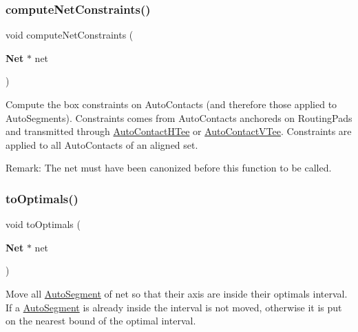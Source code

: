 \subsubsection{\texorpdfstring{compute\+Net\+Constraints()}{computeNetConstraints()}}
{\footnotesize\ttfamily void compute\+Net\+Constraints (\begin{DoxyParamCaption}\item[{\textbf{ Net} $\ast$}]{net }\end{DoxyParamCaption})}

Compute the box constraints on Auto\+Contacts (and therefore those applied to Auto\+Segments). Constraints comes from Auto\+Contacts anchoreds on Routing\+Pads and transmitted through \hyperlink{classKatabatic_1_1AutoContactHTee}{Auto\+Contact\+H\+Tee} or \hyperlink{classKatabatic_1_1AutoContactVTee}{Auto\+Contact\+V\+Tee}. Constraints are applied to all Auto\+Contacts of an aligned set.

\begin{DoxyParagraph}{Remark\+:}
The {\ttfamily net} must have been canonized before this function to be called. 
\end{DoxyParagraph}
\mbox{\label{classKatabatic_1_1KatabaticEngine_ad6b9f7d94ee4a88f12c485e48d1e644a}} 
\subsubsection{\texorpdfstring{to\+Optimals()}{toOptimals()}}
{\footnotesize\ttfamily void to\+Optimals (\begin{DoxyParamCaption}\item[{\textbf{ Net} $\ast$}]{net }\end{DoxyParamCaption})}

Move all \hyperlink{classKatabatic_1_1AutoSegment}{Auto\+Segment} of {\ttfamily net} so that their axis are inside their optimals interval. If a \hyperlink{classKatabatic_1_1AutoSegment}{Auto\+Segment} is already inside the interval is not moved, otherwise it is put on the nearest bound of the optimal interval. \mbox{\label{classKatabatic_1_1KatabaticEngine_a468eddb683c04cfeea1c5124a39e1f86}} 
